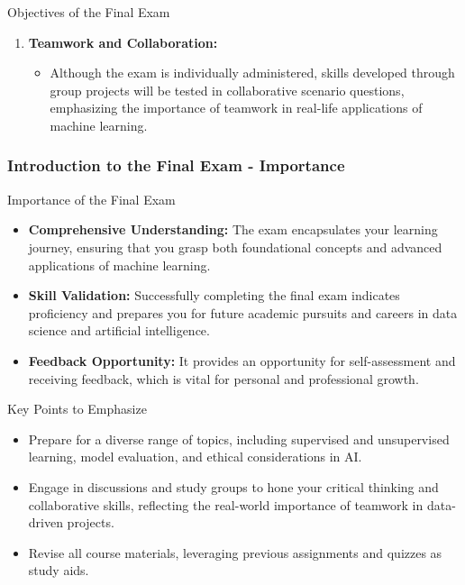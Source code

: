 \documentclass[aspectratio=169]{beamer}
\begin{document}
\begin{frame}[fragile]
\begin{block}{Objectives of the Final Exam}
\begin{enumerate}
            \item \textbf{Teamwork and Collaboration:}
                \begin{itemize}
                    \item Although the exam is individually administered, skills developed through group projects will be tested in collaborative scenario questions,
                    emphasizing the importance of teamwork in real-life applications of machine learning.
                \end{itemize}
        \end{enumerate}
    \end{block}
\end{frame}

\begin{frame}[fragile]
    \frametitle{Introduction to the Final Exam - Importance}
    \begin{block}{Importance of the Final Exam}
        \begin{itemize}
            \item \textbf{Comprehensive Understanding:} 
                The exam encapsulates your learning journey, ensuring that you grasp both foundational concepts 
                and advanced applications of machine learning.
            \item \textbf{Skill Validation:} 
                Successfully completing the final exam indicates proficiency and prepares you for future academic 
                pursuits and careers in data science and artificial intelligence.
            \item \textbf{Feedback Opportunity:} 
                It provides an opportunity for self-assessment and receiving feedback, which is vital for 
                personal and professional growth.
        \end{itemize}
    \end{block}
    \begin{block}{Key Points to Emphasize}
        \begin{itemize}
            \item Prepare for a diverse range of topics, including supervised and unsupervised learning, 
                model evaluation, and ethical considerations in AI.
            \item Engage in discussions and study groups to hone your critical thinking and collaborative skills, 
                reflecting the real-world importance of teamwork in data-driven projects.
            \item Revise all course materials, leveraging previous assignments and quizzes as study aids.
        \end{itemize}
    \end{block}
\end{frame}
\end{document}

